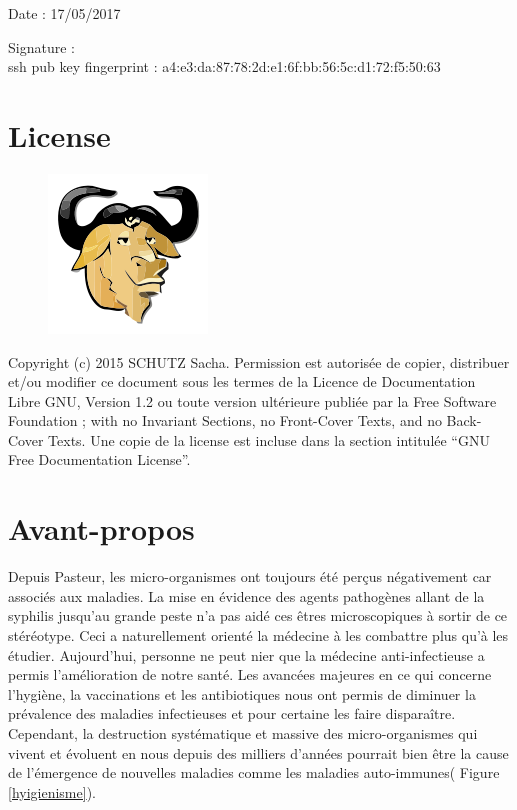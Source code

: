 \documentclass[12pt,a4paper]{article}
\begin{document}
Date : 17/05/2017

\vspace{0.5cm}

Signature : \\

ssh pub key fingerprint : a4:e3:da:87:78:2d:e1:6f:bb:56:5c:d1:72:f5:50:63
\vfill 

\section*{License}

\begin{figure}
\includegraphics[scale=0.5]{img/gfdl.png}\hfill
\end{figure}

Copyright (c) 2015 SCHUTZ Sacha. Permission est autorisée de copier,
distribuer et/ou modifier ce document sous les termes de la Licence de
Documentation Libre GNU, Version 1.2 ou toute version ultérieure publiée
par la Free Software Foundation ; with no Invariant Sections, no
Front-Cover Texts, and no Back-Cover Texts. Une copie de la license est
incluse dans la section intitulée ``GNU Free Documentation License''.

\thispagestyle{empty} 
\setcounter{page}{0}
\thispagestyle{empty} 

\newpage

\tableofcontents
\newpage


\section{Avant-propos}

Depuis Pasteur, les micro-organismes ont toujours été perçus négativement car associés aux maladies. La mise en évidence des agents pathogènes allant de la syphilis jusqu'au grande peste n'a pas aidé ces êtres microscopiques à sortir de ce stéréotype. Ceci a naturellement orienté la médecine à les combattre plus qu'à les étudier.
Aujourd'hui, personne ne peut nier que la médecine anti-infectieuse a permis l'amélioration de notre santé. 
Les avancées majeures en ce qui concerne l'hygiène, la vaccinations et les antibiotiques nous ont permis de diminuer la prévalence des maladies infectieuses  et pour certaine les faire disparaître. Cependant, la destruction systématique et massive des micro-organismes qui vivent et évoluent en nous depuis des milliers d'années pourrait bien être la cause de l'émergence de nouvelles maladies comme les maladies auto-immunes( Figure \ref{hyigienisme}).
\end{document}
